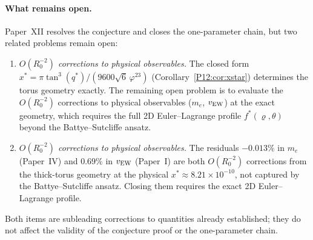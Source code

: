 \documentclass[11pt,a4paper]{article}
\theoremstyle{definition}
\theoremstyle{remark}
\newcommand{\vp}{\varphi}
\begin{document}
\paragraph{What remains open.}
Paper~XII resolves the conjecture and closes the one-parameter chain,
but two related problems remain open:
\begin{enumerate}[label=(\arabic*),noitemsep]
\item \emph{$O(R_0^{-2})$ corrections to physical observables.}
  The closed form $x^*=\pi\tan^3(q^*)/(9600\sqrt{6}\,\vp^{23})$
  (Corollary~\ref{P12:cor:xstar}) determines the torus geometry exactly.
  The remaining open problem is to evaluate the
  $O(R_0^{-2})$ corrections to physical observables ($m_e$, $v_{\rm EW}$)
  at the exact geometry, which requires the full 2D
  Euler--Lagrange profile $f^*(\varrho,\theta)$ beyond the
  Battye--Sutcliffe ansatz.
\item \emph{$O(R_0^{-2})$ corrections to physical observables.}
  The residuals $-0.013\%$ in $m_e$ (Paper~IV) and $0.69\%$ in
  $v_{\rm EW}$ (Paper~I) are both $O(R_0^{-2})$ corrections
  from the thick-torus geometry at the physical $x^*\approx8.21\times10^{-10}$,
  not captured by the Battye--Sutcliffe ansatz.
  Closing them requires the exact 2D Euler--Lagrange profile.
\end{enumerate}
Both items are subleading corrections to quantities already established;
they do not affect the validity of the conjecture proof or the
one-parameter chain.
\end{document}
